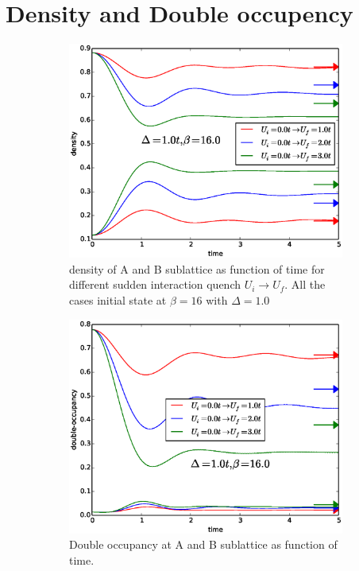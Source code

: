 \section{Density and Double occupency}
\begin{figure}[H]
\begin{subfigure}{.5\textwidth}
 \includegraphics[width=1.1\linewidth]{interaction_quench/density_interaction.eps}
  \caption{density of A and B sublattice as function of time for different sudden interaction quench $U_i \rightarrow U_f$. All the cases initial state at $\beta=16$ with $\Delta=1.0$ }
\end{subfigure}%
\begin{subfigure}{.5\textwidth}
  \includegraphics[width=1.1\linewidth]{interaction_quench/double-occupancy_interaction.eps}
  \caption{Double occupancy at A and B sublattice as function of time. }
\end{subfigure}
\caption{}
\label{density}
\end{figure}



